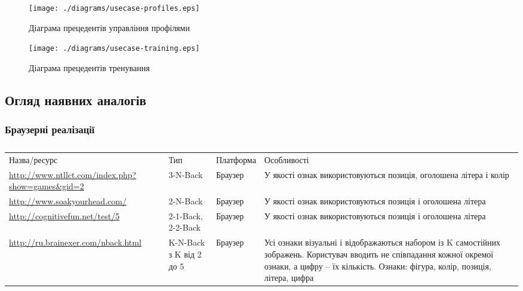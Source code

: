 \begin{figure}[here]
  \centering\texttt{[image: ./diagrams/usecase-profiles.eps]}
  \caption{Діаграма прецедентів управління профілями}
\end{figure}

\begin{figure}[here]
  \centering\texttt{[image: ./diagrams/usecase-training.eps]}
  \caption{Діаграма прецедентів тренування}
\end{figure}

\subsection{Огляд наявних аналогів}

\subsubsection{Браузерні реалізації}
\small\begin{longtable}{| C{5cm} | C{2cm} | C{2.5cm} | C{5cm} |}
  \captionsetup{justification=centering}\caption{} \\
  \hline
  Назва/ресурс & Тип & Платформа & Особливості \\
  \hline
  \url{http://www.ntllct.com/index.php?show=games\&gid=2}
  & 3-N-Back
  & Браузер
  & У якості ознак використовуються позиція, оголошена літера і колір \\
  \hline
  \url{http://www.soakyourhead.com/}
  & 2-N-Back
  & Браузер
  & У якості ознак використовуються позиція і оголошена літера \\
  \hline
  \url{http://cognitivefun.net/test/5}
  & 2-1-Back, 2-2-Back
  & Браузер
  & У якості ознак використовуються позиція і оголошена літера \\
  \hline
  \url{http://ru.brainexer.com/nback.html}
  & K-N-Back з K від 2 до 5
  & Браузер
  & Усі ознаки візуальні і відображаються набором із K самостійних зображень.
  Користувач вводить не співпадання кожної окремої ознаки, а цифру – їх кількість.
  Ознаки: фігура, колір, позиція, літера, цифра \\
  \hline
\end{longtable}\normalsize
~\newline
